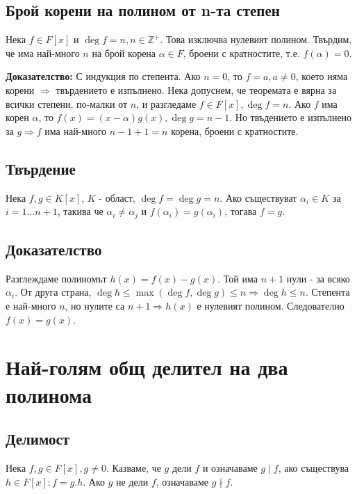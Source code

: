 \documentclass[fleqn,12pt]{article}
\begin{document}
\subsection{Брой корени на полином от n-та степен}
Нека $f \in F[x]$ и $\deg f = n, n \in \mathbb{Z}^+$. Това изключва нулевият полином.
Твърдим, че има най-много $n$ на брой корена $\alpha \in F$, броени с кратностите, т.е. $f(\alpha) = 0$.

\textbf{Доказателство: } С индукция по степента. Ако $n = 0$, то $f = a, a \neq 0$, което няма корени $\Rightarrow$
твърдението е изпълнено. Нека допуснем, че теоремата е вярна за всички степени, по-малки от $n$, и разгледаме 
$f \in F[x], \deg f = n$. Ако $f$ има корен $\alpha$, то $f(x) = (x - \alpha) g(x), \deg g = n - 1$.
Но твъдението е изпълнено за $g \Rightarrow f$ има най-много $n - 1 + 1 = n$ корена, броени с кратностите. 


\subsection{Твърдение}
Нека $f,g \in K[x]$, $K$ - област, $\deg f = \deg g = n$. Ако съществуват 
$\alpha_i \in K$ за $i=1 \dots n+1$, такива че $\alpha_i \neq \alpha_j$ и 
$f(\alpha_i) = g(\alpha_i)$, тогава $f = g$.

\subsection{Доказателство}
Разглеждаме полиномът $h(x) = f(x) - g(x)$. Той има $n + 1$ нули - за всяко $\alpha_i$.
От друга страна, $\deg h \leq \max(\deg f, \deg g) \leq n \Rightarrow \deg h \leq n$.
Степента е най-много $n$, но нулите са $n + 1 \Rightarrow h(x)$ е нулевият полином. 
Следователно $f(x) = g(x)$.

\section{Най-голям общ делител на два полинома}
\subsection{Делимост}
Нека $f,g \in F[x], g \neq 0$. Казваме, че $g$ дели $f$ и означаваме $g \mid f$,
ако съществува $h \in F[x] : f = g.h$. Ако $g$ не дели $f$, означаваме $g \nmid f$.
\end{document}
